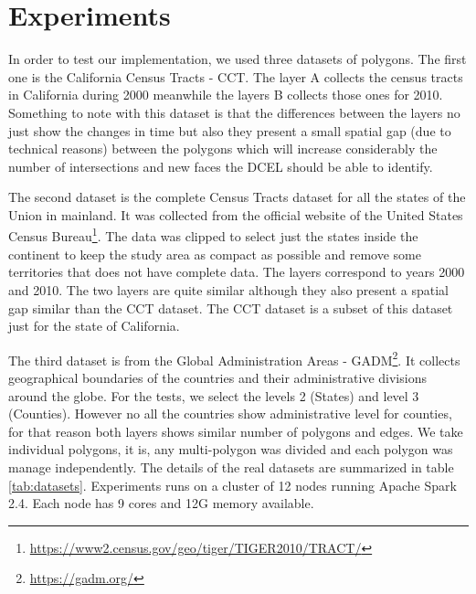 \section{Experiments} \label{sec:experiments}


In order to test our implementation, we used three datasets of polygons.  The first one is the California Census Tracts - CCT. The layer A collects the census tracts in California during 2000 meanwhile the layers B collects those ones for 2010.  Something to note with this dataset is that the differences between the layers no just show the changes in time but also they present a small spatial gap (due to technical reasons) between the polygons which will increase considerably the number of intersections and new faces the DCEL should be able to identify.

The second dataset is the complete Census Tracts dataset for all the states of the Union in mainland.  It was collected from the official website of the United States Census Bureau\footnote{\url{https://www2.census.gov/geo/tiger/TIGER2010/TRACT/}}.  The data was clipped to select just the states inside the continent to keep the study area as compact as possible and remove some territories that does not have complete data. The layers correspond to years 2000 and 2010. The two layers are quite similar although they also present a spatial gap similar than the CCT dataset.  The CCT dataset is a subset of this dataset just for the state of California.

The third dataset is from the Global Administration Areas - GADM\footnote{\url{https://gadm.org/}}. It collects geographical boundaries of the countries and their administrative divisions around the globe.  For the tests, we select the levels 2 (States) and level 3 (Counties).  However no all the countries show administrative level for counties, for that reason both layers shows similar number of polygons and edges. We take individual polygons, it is, any multi-polygon was divided and each polygon was manage independently. The details of the real datasets are summarized in table \ref{tab:datasets}.  Experiments runs on a cluster of 12 nodes running Apache Spark 2.4.  Each node has 9 cores and 12G memory available.

